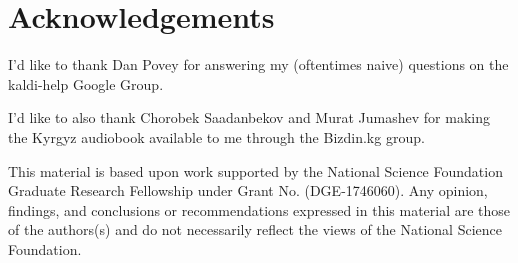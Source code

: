\documentclass[a4paper]{article}
\begin{document}
\section{Acknowledgements}

I'd like to thank Dan Povey for answering my (oftentimes naive) questions on the kaldi-help Google Group.

I'd like to also thank Chorobek Saadanbekov and Murat Jumashev for making the Kyrgyz audiobook available to me through the Bizdin.kg group.

This material is based upon work supported by the National Science Foundation Graduate Research Fellowship under Grant No. (DGE-1746060). Any opinion, findings, and conclusions or recommendations expressed in this material are those of the authors(s) and do not necessarily reflect the views of the National Science Foundation.





\newpage



\end{document}
